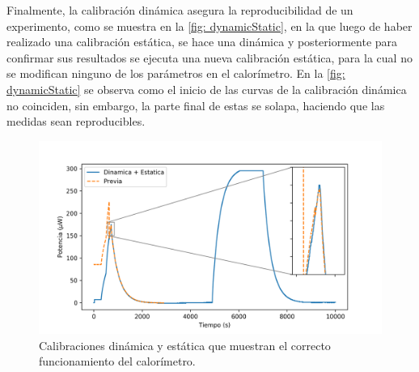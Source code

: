 	Finalmente, la calibración dinámica asegura la reproducibilidad de un experimento, como se muestra en la \autoref{fig: dynamicStatic}, en la que luego de haber realizado una calibración estática, se hace una dinámica y posteriormente para confirmar sus resultados se ejecuta una nueva calibración estática, para la cual no se modifican ninguno de los parámetros en el calorímetro. En la \autoref{fig: dynamicStatic} se observa como el inicio de las curvas de la calibración dinámica no coinciden, sin embargo, la parte final de estas se solapa, haciendo que las medidas sean reproducibles.
	\begin{figure}[h]
		\centering
		\includegraphics[width=\linewidth]{../Data/ElectricalCalibrations/Both}
		\caption{Calibraciones dinámica y estática que muestran el correcto funcionamiento del calorímetro.}
		\label{fig: dynamicStatic}
	\end{figure}
	